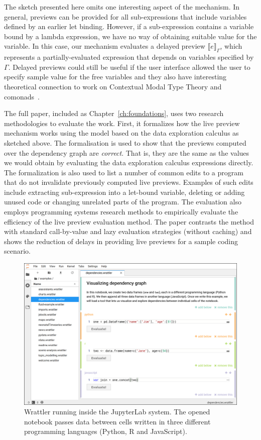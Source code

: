 \documentclass[fleqn,11pt]{report}
\theoremstyle{definition}
\begin{document}
The sketch presented here omits one interesting aspect of the mechanism. In general, previews
can be provided for all sub-expressions that include variables defined by an earlier let binding.
However, if a sub-expression contains a variable bound by a lambda expression, we have no
way of obtaining suitable value for the variable. In this case, our mechanism evaluates
a delayed preview $\llbracket e \rrbracket_\Gamma$, which represents a partially-evaluated
expression that depends on variables specified by $\Gamma$. Delayed previews could still be
useful if the user interface allowed the user to specify sample value for the free variables
and they also have interesting theoretical connection to work on Contextual Modal Type Theory
\citep{nanevski-2008-cmtt} and comonads~\citep{gabbay-2013-cmtt}.

The full paper, included as Chapter~\ref{ch:foundations}, uses two research methodologies
to evaluate the work. First, it formalizes how the live preview mechanism works using the
model based on the data exploration calculus as sketched above. The formalisation is
used to show that the previews computed over the dependency graph are \emph{correct}. That is,
they are the same as the values we would obtain by evaluating the data exploration calculus
expressions directly. The formalization is also used to list a number of common edits to
a program that do not invalidate previously computed live previews. Examples of such edits
include extracting sub-expression into a let-bound variable, deleting or adding unused code
or changing unrelated parts of the program. The evaluation also employs programming systems
research methods to empirically evaluate the efficiency of the live preview evaluation method.
The paper contrasts the method with standard call-by-value and lazy evaluation strategies
(without caching) and shows the reduction of delays in providing live previews for a sample
coding scenario.

\begin{figure}[t]
\vspace{0.5em}
\includegraphics[scale=0.25]{img/wrattler.png}
\caption{Wrattler running inside the JupyterLab system. The opened notebook passes data between
cells written in three different programming languages (Python, R and JavaScript).}
\label{fig:wrattler}
\vspace{0.5em}
\end{figure}
\end{document}
